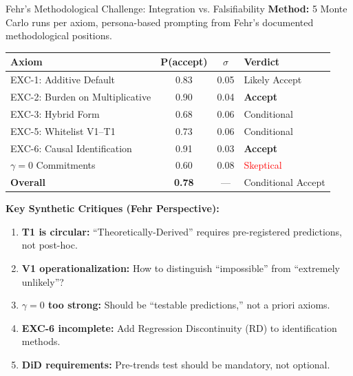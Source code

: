 \begin{chapter}{Fehr's Methodological Challenge: Integration vs. Falsifiability}
\textbf{Method:} 5 Monte Carlo runs per axiom, persona-based prompting from Fehr's documented methodological positions.

\begin{tcolorbox}[colback=green!5!white,colframe=green!75!black,title=\textbf{LLMMC Fehr Validation Results (2026-01-24)}]
\begin{tabular}{|l|c|c|l|}
\hline
\textbf{Axiom} & \textbf{P(accept)} & \textbf{$\sigma$} & \textbf{Verdict} \\
\hline
EXC-1: Additive Default & 0.83 & 0.05 & Likely Accept \\
EXC-2: Burden on Multiplicative & 0.90 & 0.04 & \textbf{Accept} \\
EXC-3: Hybrid Form & 0.68 & 0.06 & Conditional \\
EXC-5: Whitelist V1--T1 & 0.73 & 0.06 & Conditional \\
EXC-6: Causal Identification & 0.91 & 0.03 & \textbf{Accept} \\
$\gamma = 0$ Commitments & 0.60 & 0.08 & \textcolor{red}{Skeptical} \\
\hline
\textbf{Overall} & \textbf{0.78} & --- & Conditional Accept \\
\hline
\end{tabular}
\end{tcolorbox}

\textbf{Key Synthetic Critiques (Fehr Perspective):}
\begin{enumerate}[noitemsep]
    \item \textbf{T1 is circular:} ``Theoretically-Derived'' requires pre-registered predictions, not post-hoc.
    \item \textbf{V1 operationalization:} How to distinguish ``impossible'' from ``extremely unlikely''?
    \item \textbf{$\gamma = 0$ too strong:} Should be ``testable predictions,'' not a priori axioms.
    \item \textbf{EXC-6 incomplete:} Add Regression Discontinuity (RD) to identification methods.
    \item \textbf{DiD requirements:} Pre-trends test should be mandatory, not optional.
\end{enumerate}


\end{chapter}
